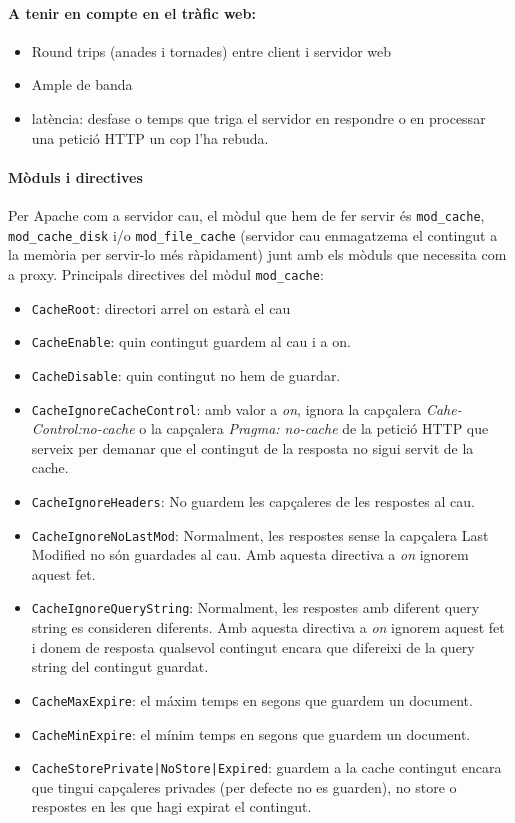 \documentclass[a4paper, 11pt]{article}
\begin{document}
\paragraph{A tenir en compte en el tràfic web:}

\begin{itemize}
	\item Round trips (anades i tornades) entre client i servidor web
	\item Ample de banda
	\item latència: desfase o temps que triga el servidor en respondre o en processar una petició HTTP un cop l'ha rebuda.
\end{itemize}

\paragraph{Mòduls i directives \\}

Per Apache com a servidor cau, el mòdul que hem de fer servir \'es \verb+mod_cache+, \verb+mod_cache_disk+ i/o \verb+mod_file_cache+ (servidor cau enmagatzema el contingut a la memòria per servir-lo m\'es ràpidament) junt amb els mòduls que necessita com a proxy. Principals directives del mòdul \verb+mod_cache+:

\begin{itemize}
	\item \verb+CacheRoot+: directori arrel on estarà el cau
	\item \verb+CacheEnable+: quin contingut guardem al cau i a on.
	\item \verb+CacheDisable+: quin contingut no hem de guardar.
	\item \verb+CacheIgnoreCacheControl+: amb valor a \textit{on}, ignora la capçalera \textit{Cahe-Control:no-cache} o la capçalera \textit{Pragma: no-cache} de la petició HTTP que serveix per demanar que el contingut de la resposta no sigui servit de la cache.
	\item \verb+CacheIgnoreHeaders+: No guardem les capçaleres de les respostes al cau.
	\item \verb+CacheIgnoreNoLastMod+: Normalment, les respostes sense la capçalera Last Modified no són guardades al cau. Amb aquesta directiva a \textit{on} ignorem aquest fet.
	\item \verb+CacheIgnoreQueryString+: Normalment, les respostes amb diferent query string es consideren diferents. Amb aquesta directiva a \textit{on} ignorem aquest fet i donem de resposta qualsevol contingut encara que difereixi de la query string del contingut guardat.
	\item \verb+CacheMaxExpire+: el máxim temps en segons que guardem un document.
	\item \verb+CacheMinExpire+: el mínim temps en segons que guardem un document.
	\item \verb+CacheStorePrivate|NoStore|Expired+: guardem a la cache contingut encara que tingui capçaleres privades (per defecte no es guarden), no store o respostes en les que hagi expirat el contingut.
\end{itemize}
\end{document}
